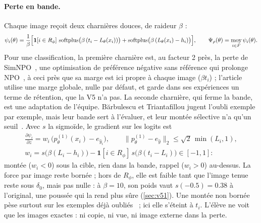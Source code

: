 \documentclass[11pt,a4paper]{article}
\newcommand{\Exp}{\operatorname*{moy}}
\begin{document}
\paragraph{Perte en bande.} Chaque image reçoit deux charnières douces, de raideur $\beta$ :
\begin{equation}\label{eq:v5band}
  \psi_i(\theta)=\frac1\beta\Bigl[\mathbf 1[i\in R_\phi]\,\operatorname{softplus}\bigl(\beta\,(t_i-L_\theta(x_i))\bigr)
  +\operatorname{softplus}\bigl(\beta\,(L_\theta(x_i)-h_i)\bigr)\Bigr],\qquad
  \Psi_\rho(\theta)=\Exp_{i\in F}\psi_i(\theta).
\end{equation}
Pour une classification, la première charnière est, au facteur 2 près, la perte de
SimNPO~\cite{fan2025simnpo}, une optimisation de préférence négative sans référence qui prolonge
NPO~\cite{zhang2024npo}, à ceci près que sa marge est ici propre à chaque image ($\beta t_i$) ; l'article
utilise une marge globale, nulle par défaut, et garde dans ses expériences un terme de rétention, que la
V5 n'a pas. La seconde charnière, qui ferme la bande, est une adaptation de l'équipe. Bărbulescu et
Triantafillou jugent l'oubli exemple par exemple, mais leur bande sert à l'évaluer, et leur montée
sélective n'a qu'un seuil~\cite{barbulescu2024each}. Avec $s$ la sigmoïde, le gradient sur les logits est
\begin{equation}\label{eq:v5grad}
  \begin{gathered}
  \frac{\partial\psi_i}{\partial z}=w_i\,\bigl(p^{(1)}_\theta(x_i)-e_{\hat y_i}\bigr),\qquad
  \bigl\|p^{(1)}_\theta-e_{\hat y}\bigr\|_2\le\sqrt2\,\min(L_i,1),\\
  w_i=s\bigl(\beta(L_i-h_i)\bigr)-\mathbf 1[i\in R_\phi]\,s\bigl(\beta(t_i-L_i)\bigr)\in[-1,1] :
  \end{gathered}
\end{equation}
montée ($w_i<0$) sous la cible, rien dans la bande, rappel ($w_i>0$) au-dessus. La force par image
reste bornée ; hors de $R_\phi$, elle est faible tant que l'image tenue reste sous $\delta_0$, mais
pas nulle : à $\beta=10$, son poids vaut $s(\num{-0.5})=\num{0.38}$ à l'original, une poussée qui
la rend plus sûre (\cref{sec:v51}). Une montée non
bornée pèse surtout sur les exemples déjà oubliés~\cite{wang2025geffect} ; ici elle s'éteint à $t_i$.
L'élève ne voit que les images exactes : ni copie, ni vue, ni image externe dans la perte.
\end{document}
